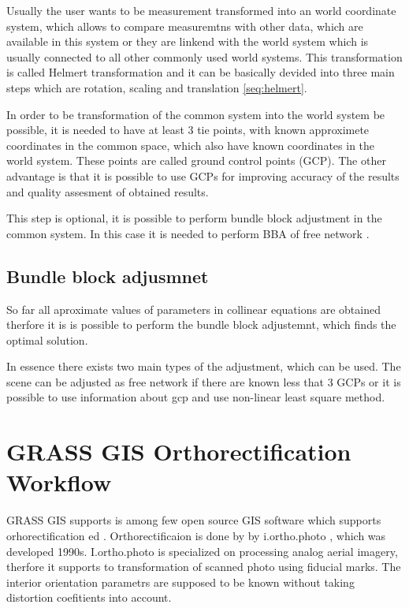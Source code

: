 \documentclass[a4paper,12pt]{report}
\begin{document}
Usually the user wants to be measurement transformed into an world coordinate system, which allows 
to compare measuremtns with other data, which are available in this system or they are 
linkend with the world system which is usually connected to all other commonly used  world systems. 
This transformation is called Helmert  transformation and it can be basically devided into 
three main steps which are rotation, scaling and translation \ref{seq:helmert}.

In order to be transformation of the common system into the world system be possible, it is needed 
to have at least 3 tie points, with known approximete coordinates in the common space, which also have 
known coordinates in the world system. These points are called ground control points (GCP). The other advantage is that it is possible to use GCPs for improving accuracy of the results and 
 quality assesment of obtained results.
 
This step is optional, it is possible to perform bundle block adjustment in the common system. In this 
case it is needed to perform BBA of free network \label{sec:free_net_least}. 
 
 
\subsection{Bundle block adjusmnet}

So far all aproximate values of parameters in collinear equations are obtained therfore it 
is is possible to perform the bundle block adjustemnt, which finds the optimal solution.

In essence there exists two main types of the adjustment, which can be used. The scene 
can be adjusted as free network if there are known less that 3 GCPs or it is possible 
to use information about gcp and use non-linear least square method.

\section{GRASS GIS Orthorectification Workflow}

GRASS GIS supports is among few open source GIS software which supports orhorectification ed
\cite{rocchini2012robust}. Orthorectificaion is done by 
by i.ortho.photo \cite{i.ortho.photo}, which was developed 1990s.
I.ortho.photo is specialized on processing analog aerial imagery, therfore 
it supports to transformation of scanned photo using fiducial marks. 
The interior orientation parametrs are supposed to be known without taking distortion 
coefitients into account. 
\end{document}
